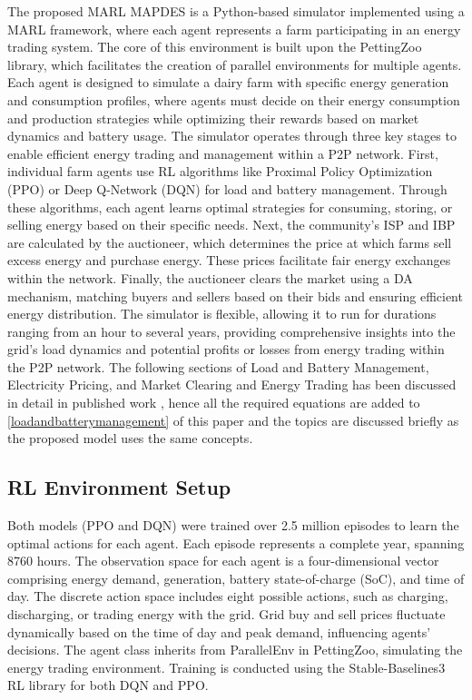 \documentclass[preprint,12pt]{elsarticle}
\begin{document}
The proposed MARL MAPDES is a Python-based simulator implemented using a MARL framework, where each agent represents a farm participating in an energy trading system. The core of this environment is built upon the PettingZoo library, which facilitates the creation of parallel environments for multiple agents. Each agent is designed to simulate a dairy farm with specific energy generation and consumption profiles, where agents must decide on their energy consumption and production strategies while optimizing their rewards based on market dynamics and battery usage.
The simulator operates through three key stages to enable efficient energy trading and management within a P2P network. First, individual farm agents use RL algorithms like Proximal Policy Optimization (PPO) or Deep Q-Network (DQN) for load and battery management. Through these algorithms, each agent learns optimal strategies for consuming, storing, or selling energy based on their specific needs. Next, the community’s ISP and IBP are calculated by the auctioneer, which determines the price at which farms sell excess energy and purchase energy. These prices facilitate fair energy exchanges within the network. Finally, the auctioneer clears the market using a DA mechanism, matching buyers and sellers based on their bids and ensuring efficient energy distribution. The simulator is flexible, allowing it to run for durations ranging from an hour to several years, providing comprehensive insights into the grid's load dynamics and potential profits or losses from energy trading within the P2P network. The following sections of Load and Battery Management, Electricity Pricing, and Market Clearing and Energy Trading has been discussed in detail in published work \cite{shah2024peer}, hence all the required equations are added to \ref{loadandbatterymanagement} of this paper and the topics are discussed briefly as the proposed model uses the same concepts.


\subsection{RL Environment Setup}

Both models (PPO and DQN) were trained over 2.5 million episodes to learn the optimal actions for each agent. Each episode represents a complete year, spanning 8760 hours. The observation space for each agent is a four-dimensional vector comprising energy demand, generation, battery state-of-charge (SoC), and time of day. The discrete action space includes eight possible actions, such as charging, discharging, or trading energy with the grid. Grid buy and sell prices fluctuate dynamically based on the time of day and peak demand, influencing agents' decisions. The agent class inherits from ParallelEnv in PettingZoo, simulating the energy trading environment. Training is conducted using the Stable-Baselines3 RL library \cite{stablebaselines3docs} for both DQN and PPO.
\end{document}
